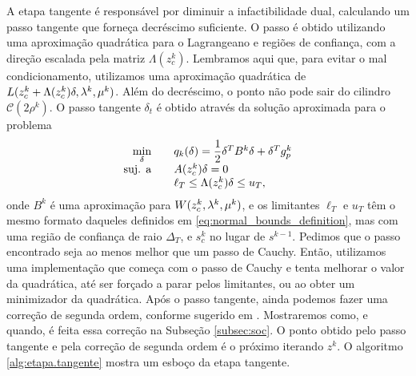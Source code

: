 A etapa tangente é responsável por diminuir a infactibilidade dual, calculando
um passo tangente que forneça decréscimo suficiente.
O passo é obtido utilizando uma aproximação quadrática para o Lagrangeano e
regiões de confiança, com a direção escalada pela matriz $\Lambda(z_c^k)$. 
Lembramos aqui que, para evitar o mal condicionamento, utilizamos uma aproximação
quadrática de $L(z_c^k + \Lambda(z_c^k)\delta, \lambda^{k}, \mu^k)$.
Além do decréscimo, o ponto não pode sair do cilindro
$\mathcal{C}(2\rho^k)$.
O passo tangente $\delta_t$ \'e obtido atrav\'es da solu\c{c}\~ao aproximada para o
problema
\begin{equation}\visiblelbl{prob:tangente}
  \begin{array}{rcl}
  \displaystyle\min_{\delta} & & q_k(\delta) = \dfrac{1}{2}\delta^TB^k\delta +
  \delta^Tg_p^k \\
 \mbox{suj. a} & & A(\zc{k})\delta = 0 \\
               & & \ell_T \leq \Lambda(z_c^k)\delta \leq u_T,
  \end{array}
\end{equation}
onde $B^k$ \'e uma aproxima\c{c}\~ao para $W(z_c^{k},\lambda^{k},\mu^k)$, e
os limitantes $\ell_T$ e $u_T$ têm o mesmo formato daqueles definidos
em \eqref{eq:normal_bounds_definition},
mas com uma regi\~ao de confian\c{c}a de raio $\Delta_T$, e $s_c^k$ no lugar de
$s^{k-1}$.
Pedimos que o passo encontrado
seja ao menos melhor que um passo de Cauchy. Então, utilizamos uma implementação
que começa com o passo de Cauchy e tenta melhorar o valor da quadrática, até ser
forçado a parar pelos limitantes, ou ao obter um minimizador da quadrática.
Após o passo tangente, ainda podemos fazer uma correção de segunda ordem, 
conforme sugerido em \cite{bib:book-conn-trust}. Mostraremos como, e quando, é
feita essa correção na Subseção \ref{subsec:soc}.
O ponto obtido pelo passo tangente e pela correção de segunda ordem é o próximo
iterando $z^k$.
O algoritmo \ref{alg:etapa.tangente} mostra um esboço da etapa tangente.
